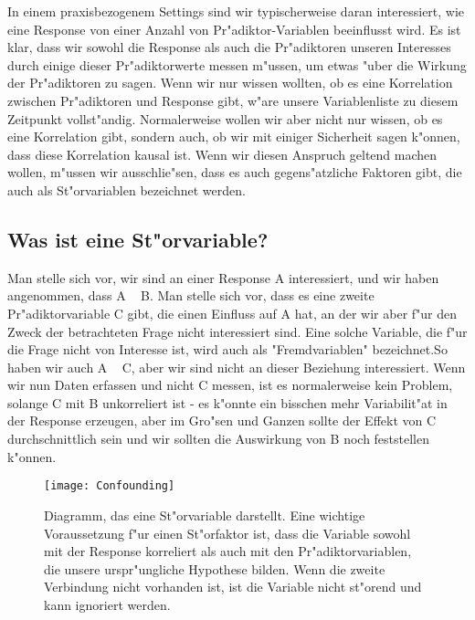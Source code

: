 \documentclass[a4paper,twoside]{tufte-book}\usepackage[]{graphicx}\usepackage[]{color}
\begin{document}
In einem praxisbezogenem Settings sind wir typischerweise daran interessiert, wie eine Response von einer Anzahl von Pr"adiktor-Variablen beeinflusst wird. Es ist klar, dass wir sowohl die Response als auch die Pr"adiktoren unseren Interesses durch einige dieser Pr"adiktorwerte messen m"ussen, um etwas "uber die Wirkung der Pr"adiktoren zu sagen. Wenn wir nur wissen wollten, ob es eine Korrelation zwischen Pr"adiktoren und Response gibt, w"are unsere Variablenliste zu diesem Zeitpunkt vollst"andig. Normalerweise wollen wir aber nicht nur wissen, ob es eine Korrelation gibt, sondern auch, ob wir mit einiger Sicherheit sagen k"onnen, dass diese Korrelation kausal ist. Wenn wir diesen Anspruch geltend machen wollen, m"ussen wir ausschlie"sen, dass es auch gegens"atzliche Faktoren gibt, die auch als St"orvariablen bezeichnet werden.

\subsection{Was ist eine St"orvariable?}

Man stelle sich vor, wir sind an einer Response A interessiert, und wir haben angenommen, dass A ~ B. Man stelle sich vor, dass es eine zweite Pr"adiktorvariable C gibt, die einen Einfluss auf A hat, an der wir aber f"ur den Zweck der betrachteten Frage nicht interessiert sind. Eine solche Variable, die f"ur die Frage nicht von Interesse ist, wird auch als "Fremdvariablen" bezeichnet.So haben wir auch A ~ C, aber wir sind nicht an dieser Beziehung interessiert. Wenn wir nun Daten erfassen und nicht C messen, ist es normalerweise kein Problem, solange C mit B unkorreliert ist - es k"onnte ein bisschen mehr Variabilit"at in der Response erzeugen, aber im Gro"sen und Ganzen sollte der Effekt von C durchschnittlich sein und wir sollten die Auswirkung von B noch feststellen k"onnen.

\begin{figure}[]
\begin{center}
\texttt{[image: Confounding]}
\caption{Diagramm, das eine St"orvariable darstellt. Eine wichtige Voraussetzung f"ur einen St"orfaktor ist, dass die Variable sowohl mit der Response korreliert als auch mit den Pr"adiktorvariablen, die unsere urspr"ungliche Hypothese bilden. Wenn die zweite Verbindung nicht vorhanden ist, ist die Variable nicht st"orend und kann ignoriert werden.}
\label{fig: Confounding}
\end{center}
\end{figure}
\end{document}
